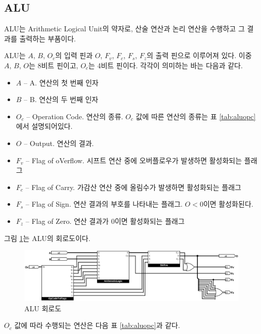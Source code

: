 \documentclass{article}
\renewcommand{\figurename}{그림}
\renewcommand{\tablename}{표}
\begin{document}
\pagebreak

\subsection{ALU}

ALU는 Arithmetic Logical Unit의 약자로,
산술 연산과 논리 연산을 수행하고 그 결과를 출력하는 부품이다.

ALU는 $A$, $B$, $O_c$의 입력 핀과
$O$, $F_v$, $F_c$, $F_s$, $F_z$의 출력 핀으로 이루어져 있다.
이중 $A$, $B$, $O$는 8비트 핀이고, $O_c$는 4비트 핀이다.
각각이 의미하는 바는 다음과 같다.

\begin{itemize}
    \item $A$ -- A. 연산의 첫 번째 인자
    \item $B$ -- B. 연산의 두 번째 인자
    \item $O_c$ -- Operation Code. 연산의 종류.
        $O_c$ 값에 따른 연산의 종류는 \tablename{} \ref{tab:aluopc}에서 설명되어있다.
    \item $O$ -- Output. 연산의 결과.
    \item $F_v$ -- Flag of oVerflow. 시프트 연산 중에 오버플로우가 발생하면
        활성화되는 플래그
    \item $F_c$ -- Flag of Carry. 가감산 연산 중에 올림수가 발생하면
        활성화되는 플래그
    \item $F_s$ -- Flag of Sign. 연산 결과의 부호를 나타내는 플래그.
        $O < 0$이면 활성화된다.
    \item $F_z$ -- Flag of Zero. 연산 결과가 $0$이면 활성화되는 플래그
\end{itemize}

\figurename{} \ref{fig:alu}는 ALU의 회로도이다.

\begin{figure}[h]
    \centering
    \includegraphics[scale=0.25]{ALU}
    \caption{ALU 회로도}
    \label{fig:alu}
\end{figure}

$O_c$ 값에 따라 수행되는 연산은 다음 \tablename{} \ref{tab:aluopc}과 같다.
\end{document}
